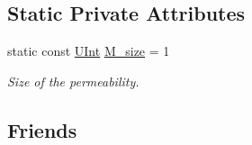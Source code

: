 \subsection*{Static Private Attributes}
\begin{DoxyCompactItemize}
\item 
static const \hyperlink{namespaceFVCode3D_a4bf7e328c75d0fd504050d040ebe9eda}{U\+Int} \hyperlink{classFVCode3D_1_1PermeabilityScalar_a6f91aef28a6af7ae9c69e0c43dc445ca}{M\+\_\+size} = 1
\begin{DoxyCompactList}\small\item\em Size of the permeability. \end{DoxyCompactList}\end{DoxyCompactItemize}
\subsection*{Friends}
